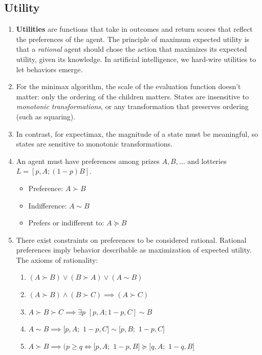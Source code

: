 \documentclass[10pt]{article}
\begin{document}
\begin{multicols}{2}
\begin{addmargin}[0.8em]{0.5em}
    \subsection{Utility}
    \begin{enumerate}[label=(\alph*)]
        \item \textbf{Utilities} are functions that take in outcomes and return scores that reflect the preferences of the agent. The principle of maximum expected utility is that a \textit{rational} agent should chose the action that maximizes its expected utility, given its knowledge. In artificial intelligence, we hard-wire utilities to let behaviors emerge.
        \item For the minimax algorithm, the scale of the evaluation function doesn't matter: only the ordering of the children matters. States are insensitive to \textit{monotonic transformations}, or any transformation that preserves ordering (such as squaring).
        \item In contrast, for expectimax, the magnitude of a state must be meaningful, so states are sensitive to monotonic transformations.
        \item An agent must have preferences among prizes $A, B,\hdots$ and lotteries $L=[p,A;(1-p)B]$. 
        \begin{itemize}
            \item Preference: $A \succ B$
            \item Indifference: $A \sim B$
            \item Prefers or indifferent to: $A \succeq B$
        \end{itemize}
        \item There exist constraints on preferences to be considered rational. Rational preferences imply behavior describable as maximization of expected utility. The axioms of rationality:
        \begin{enumerate}[label=\roman*.]
            \item $(A \succ B) \lor (B \succ A) \lor (A \sim B)$
            \item $(A \succ B) \land (B \succ C) \implies (A \succ C)$
            \item $A \succ B \succ C \implies \exists p$ $[p,A;1-p,C] \sim B$
            \item $A \sim B \implies [p,A;$ $1-p,C] \sim [p,B;$ $1-p,C]$
            \item $A \succ B \implies (p \geq q \iff [p,A;$ $1-p,B] \succeq [q,A;$ $1-q,B]$
        \end{enumerate}

\end{enumerate}
\end{addmargin}
\end{multicols}
\end{document}

